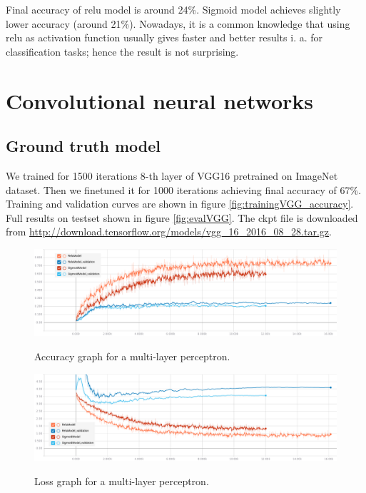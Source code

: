 \documentclass[a4paper]{article}
\begin{document}
\begin{multicols}{2}
Final accuracy of relu model is around 24\%.
Sigmoid model achieves slightly lower accuracy (around 21\%).
Nowadays, it is a common knowledge that using relu as activation function
usually gives faster and better results i. a. for classification tasks;
hence the result is not surprising.





\section{Convolutional neural networks}

\subsection{Ground truth model}

We trained for 1500 iterations 8-th layer of VGG16\cite{VGG16}
pretrained on ImageNet\cite{ImageNet} dataset.
Then we finetuned it for 1000 iterations achieving final accuracy of 67\%.
Training and validation curves are shown in figure \ref{fig:trainingVGG_accuracy}. %
Full results on testset shown in figure \ref{fig:evalVGG}.
The ckpt file is downloaded from \url{http://download.tensorflow.org/models/vgg_16_2016_08_28.tar.gz}.

\end{multicols}

\begin{figure}[h]
    \caption[]{Accuracy graph for a multi-layer perceptron.}
    \centering
    \includegraphics[page=2,width=1.0\textwidth]{training_accuracy.png}
    \label{fig:training_accuracy}
\end{figure}

\begin{figure}[h]
    \caption[]{Loss graph for a multi-layer perceptron.}
    \centering
    \includegraphics[page=2,width=1.0\textwidth]{training_loss.png}
    \label{fig:training_loss}
\end{figure}
\end{document}
